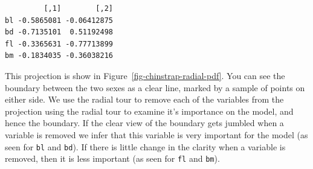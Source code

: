\documentclass[
  letterpaper,
]{krantz}
\begin{document}
\begin{verbatim}
         [,1]        [,2]
bl -0.5865081 -0.06412875
bd -0.7135101  0.51192498
fl -0.3365631 -0.77713899
bm -0.1834035 -0.36038216
\end{verbatim}

This projection is show in Figure~\ref{fig-chinstrap-radial-pdf}. You
can see the boundary between the two sexes as a clear line, marked by a
sample of points on either side. We use the radial tour to remove each
of the variables from the projection using the radial tour to examine
it's importance on the model, and hence the boundary. If the clear view
of the boundary gets jumbled when a variable is removed we infer that
this variable is very important for the model (as seen for \texttt{bl}
and \texttt{bd}). If there is little change in the clarity when a
variable is removed, then it is less important (as seen for \texttt{fl}
and \texttt{bm}). 
\end{document}
